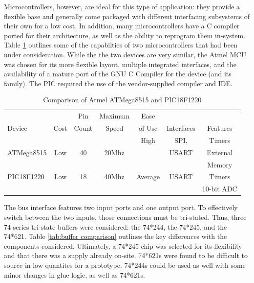 Microcontrollers, however, are ideal for this type of application: they provide
 a flexible base and generally come packaged with different interfacing 
subsystems of their own for a low cost. In addition, many microcontrollers 
have a C compiler ported for their architecture, as well as the ability to
 reprogram them in-system. Table \ref{tab:MCU capabilities} outlines some of
 the capabilties of two microcontrollers that had been under consideration.
 While the the two devices are very similar, the Atmel MCU was chosen for its
 more flexible layout, multiple integrated interfaces, and the availability
 of a mature port of the GNU C Compiler for the device (and its family). The 
PIC required the use of the vendor-supplied compiler and IDE.
\begin{table}[bp]
\caption[Atmel and PIC MCUs]{Comparison of Atmel ATMega8515\cite{ds:ATMEGA8515
} and PIC18F1220\cite{ds:pic18f1220}\cite{web:pic18f1220}}
\begin{tabular}{l| c c c c c c}
\setlength{\tabcolsep}{1pt}
	       &      & \small{Pin}  & \small{Maximum} & \small{Ease}   &            &         \\
	\small{Device} & \small{Cost} & \small{Count} & \small{Speed}  & \small{of Use} 
	& \small{Interfaces} & \small{Features}\\\hline
	\multirow{3}{*}{\small{ATMega8515}} & \multirow{3}{*}{\small{Low}} & \multirow{3}{*}{\small{40}}
	& \multirow{3}{*}{\small{20Mhz}} & \small{High} 
	& \small{SPI,} & \small{Timers}\\
	           &     &    &       &      &\small{USART} & \small{External}\\
	& & & & & &\small{Memory}\\\hline
	\small{PIC18F1220} & \small{Low} & \small{18} & \small{40Mhz} & \small{Average} & 
	\small{USART} & \small{Timers} \\
	           &     &    &       &      &  & \small{10-bit ADC}\\
\end{tabular}
\label{tab:MCU capabilities}
\end{table}

The bus interface features two input ports and one output port. To effectively
 switch between the two inputs, those connections must be tri-stated. Thus, three 
74-series tri-state buffers were considered: the 74*244, the 74*245, and the 
74*621. Table \ref{tab:buffer comparison} outlines the key differences with 
the components considered. Ultimately, a 74*245 chip was selected for its 
flexibility and that there was a supply already on-site. 74*621s were found 
to be difficult to source in low quantites for a prototype. 74*244s could be 
used as well with some minor changes in glue logic, as well as 74*621s.

